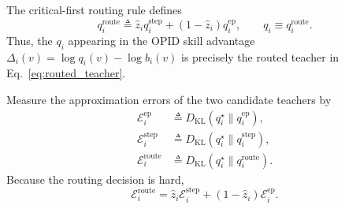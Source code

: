 \documentclass{llmxive}
\begin{document}
The critical-first routing rule defines
\begin{equation}
 q_i^{\mathrm{route}}
 \triangleq
 \widehat z_i q_i^{\mathrm{step}}
 +
 \left(
   1-\widehat z_i
 \right)
 q_i^{\mathrm{ep}},
 \qquad
 q_i\equiv q_i^{\mathrm{route}}.
\label{eq:routed_teacher}
\end{equation}
Thus, the \(q_i\) appearing in the OPID skill advantage
\(\Delta_i(v)=\log q_i(v)-\log b_i(v)\) is precisely the routed teacher in
Eq.~\ref{eq:routed_teacher}.

Measure the approximation errors of the two candidate teachers by
\begin{equation}
\begin{aligned}
 \mathcal E_i^{\mathrm{ep}}
 &\triangleq
 D_{\mathrm{KL}}
 \left(
   q_i^\star\|q_i^{\mathrm{ep}}
 \right),
 \\
 \mathcal E_i^{\mathrm{step}}
 &\triangleq
 D_{\mathrm{KL}}
 \left(
   q_i^\star\|q_i^{\mathrm{step}}
 \right),
 \\
 \mathcal E_i^{\mathrm{route}}
 &\triangleq
 D_{\mathrm{KL}}
 \left(
   q_i^\star\|q_i^{\mathrm{route}}
 \right).
\end{aligned}
\label{eq:routing_errors}
\end{equation}
Because the routing decision is hard,
\begin{equation*}
 \mathcal E_i^{\mathrm{route}}
 =
 \widehat z_i
 \mathcal E_i^{\mathrm{step}}
 +
 \left(
   1-\widehat z_i
 \right)
 \mathcal E_i^{\mathrm{ep}}.
\end{equation*}
\end{document}
